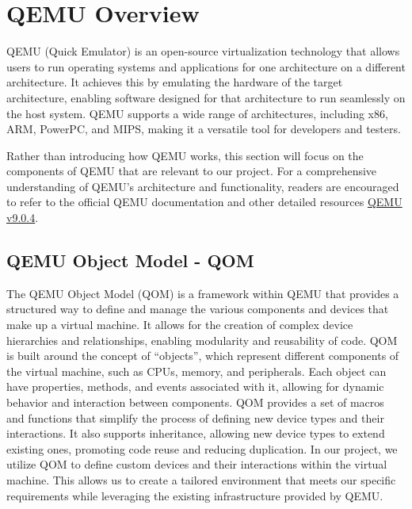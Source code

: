 \section{QEMU Overview}

QEMU (Quick Emulator) is an open-source virtualization technology that allows users to run operating systems and applications for one architecture on a different architecture. It achieves this by emulating the hardware of the target architecture, enabling software designed for that architecture to run seamlessly on the host system. QEMU supports a wide range of architectures, including x86, ARM, PowerPC, and MIPS, making it a versatile tool for developers and testers.

Rather than introducing how QEMU works, this section will focus on the components of QEMU that are relevant to our project. For a comprehensive understanding of QEMU's architecture and functionality, readers are encouraged to refer to the official QEMU documentation and other detailed resources \href{https://qemu.readthedocs.io/en/v9.0.4/}{QEMU v9.0.4}.

\subsection{QEMU Object Model - QOM}
The QEMU Object Model (QOM) is a framework within QEMU that provides a structured way to define and manage the various components and devices that make up a virtual machine. It allows for the creation of complex device hierarchies and relationships, enabling modularity and reusability of code.
QOM is built around the concept of ``objects'', which represent different components of the virtual machine, such as CPUs, memory, and peripherals. Each object can have properties, methods, and events associated with it, allowing for dynamic behavior and interaction between components.
QOM provides a set of macros and functions that simplify the process of defining new device types and their interactions. It also supports inheritance, allowing new device types to extend existing ones, promoting code reuse and reducing duplication.
In our project, we utilize QOM to define custom devices and their interactions within the virtual machine. This allows us to create a tailored environment that meets our specific requirements while leveraging the existing infrastructure provided by QEMU.

